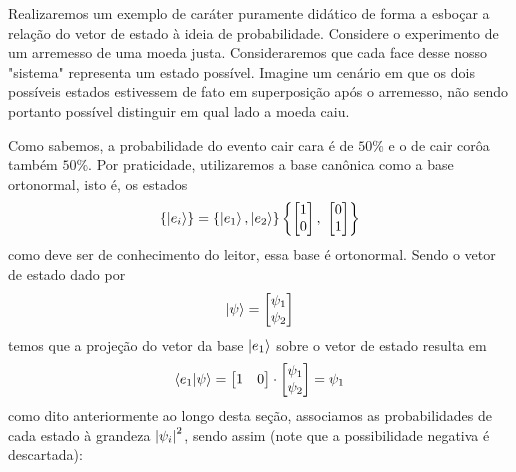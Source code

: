 \begin{example}{}

    Realizaremos um exemplo de caráter puramente didático de forma a esboçar a relação do vetor de estado à ideia de probabilidade. Considere o experimento de um arremesso de uma moeda justa. Consideraremos que cada face desse nosso "sistema" representa um estado possível. Imagine um cenário em que os dois possíveis estados estivessem de fato em superposição após o arremesso, não sendo portanto possível distinguir em qual lado a moeda caiu. 
    
    Como sabemos, a probabilidade do evento cair cara é de $50\%$ e o de cair corôa também $50\%$. Por praticidade, utilizaremos a base canônica como a base ortonormal, isto é, os estados
    \begin{equation*}
    \{\ket{e_i}\} = \{\ket{e_1}, \ket{e_2}\}
    \left\{
    \begin{bmatrix}
        1 \\
        0
    \end{bmatrix}, \ 
    \begin{bmatrix}
        0 \\
        1
    \end{bmatrix}
    \right\}
    \end{equation*}
    como deve ser de conhecimento do leitor, essa base é ortonormal. Sendo o vetor de estado dado por 
    \begin{equation*}
        \ket{\psi} = 
        \begin{bmatrix}
        \psi_1 \\
        \psi_2
        \end{bmatrix}
    \end{equation*}
    temos que a projeção do vetor da base $\ket{e_1}$ sobre o vetor de estado resulta em
    \begin{equation*}
        \braket{e_1}{\psi} = 
        \begin{bmatrix}
            1 & 0
        \end{bmatrix}
        \cdot
        \begin{bmatrix}
        \psi_1 \\
        \psi_2
        \end{bmatrix}
        = \psi_1
    \end{equation*}
    como dito anteriormente ao longo desta seção, associamos as probabilidades de cada estado à grandeza $\abs{\psi_i}^2$, sendo assim (note que a possibilidade negativa é descartada):

\end{example}
